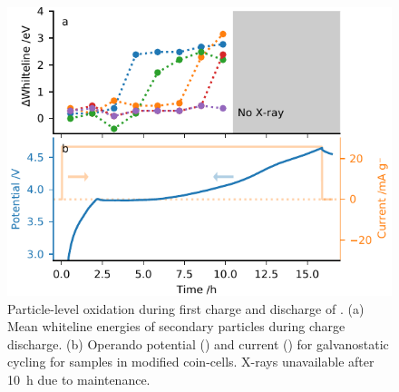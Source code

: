 \documentclass{article}
\begin{document}
\begin{figure}
  \begin{center}
    \includegraphics{figures/NMC532-particle-echem.pdf}
  \end{center}
  \caption{Particle-level oxidation during first charge and discharge
    of \nmc[532]{}. (a) Mean whiteline energies of secondary particles
    during charge discharge. (b) Operando potential
    (\textcolor{C0}{\mplline{}}) and current
    (\textcolor{C1}{\mplline{}}) for galvanostatic cycling for
    \nmc[532]{} samples in modified coin-cells. X-rays unavailable
    after \SI{10}{\hour} due to maintenance.}
  \label{fig:nmc532-particles}
\end{figure}
\end{document}
